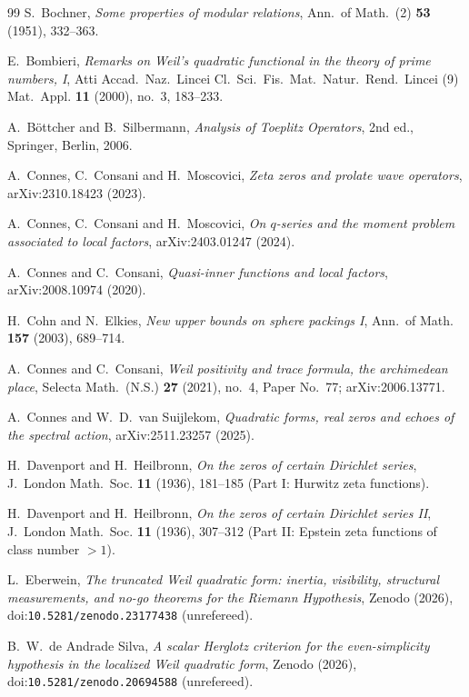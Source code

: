 \documentclass[11pt]{amsart}
\theoremstyle{definition}
\theoremstyle{remark}
\begin{document}
\begin{thebibliography}{99}
 S.~Bochner, \emph{Some properties of modular relations}, Ann.\ of Math.\ (2) \textbf{53} (1951), 332--363.

 E.~Bombieri, \emph{Remarks on Weil's quadratic functional in the theory of
prime numbers, I}, Atti Accad.~Naz.~Lincei Cl.~Sci.~Fis.~Mat.~Natur.~Rend.~Lincei (9) Mat.~Appl.
\textbf{11} (2000), no.~3, 183--233.

 A.~B\"ottcher and B.~Silbermann, \emph{Analysis of Toeplitz Operators}, 2nd ed., Springer, Berlin, 2006.

 A.~Connes, C.~Consani and H.~Moscovici, \emph{Zeta zeros and prolate wave operators}, arXiv:2310.18423 (2023).

 A.~Connes, C.~Consani and H.~Moscovici, \emph{On $q$-series and the moment problem associated to local factors}, arXiv:2403.01247 (2024).

 A.~Connes and C.~Consani, \emph{Quasi-inner functions and local factors}, arXiv:2008.10974 (2020).

 H.~Cohn and N.~Elkies, \emph{New upper bounds on sphere packings I},
Ann.~of Math. \textbf{157} (2003), 689--714.

 A.~Connes and C.~Consani, \emph{Weil positivity and trace formula, the archimedean place}, Selecta Math.\ (N.S.) \textbf{27} (2021), no.~4, Paper No.~77; arXiv:2006.13771.

 A.~Connes and W.~D.~van Suijlekom, \emph{Quadratic forms, real zeros and echoes of the spectral action}, arXiv:2511.23257 (2025).

 H.~Davenport and H.~Heilbronn, \emph{On the zeros of certain
Dirichlet series}, J.~London Math.~Soc. \textbf{11} (1936), 181--185 (Part I: Hurwitz zeta functions).

 H.~Davenport and H.~Heilbronn, \emph{On the zeros of certain
Dirichlet series II}, J.~London Math.~Soc. \textbf{11} (1936), 307--312 (Part II: Epstein zeta functions of class number $>1$).

 L.~Eberwein, \emph{The truncated Weil quadratic form: inertia, visibility, structural measurements, and no-go theorems for the Riemann Hypothesis}, Zenodo (2026), doi:\nolinkurl{10.5281/zenodo.23177438} (unrefereed).

 B.~W.~de Andrade Silva, \emph{A scalar Herglotz criterion for the even-simplicity hypothesis in the localized Weil quadratic form}, Zenodo (2026), doi:\nolinkurl{10.5281/zenodo.20694588} (unrefereed).


\end{thebibliography}
\end{document}
